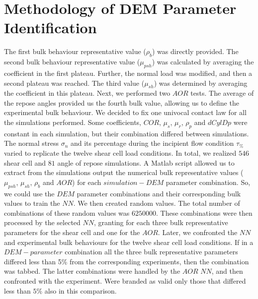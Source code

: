 \section{Methodology of DEM Parameter Identification}
\label{sec:methodology}

The first bulk behaviour representative value ($\rho_b$) was directly provided. 
The second bulk behaviour representative value ($\mu_{psh}$) was calculated by
averaging the coefficient in the first plateau.
Further, the normal load was modified, and then a second plateau was reached. The third value ($\mu_{sh}$) was 
determined by averaging the coefficient in this plateau. 
Next, we performed two $AOR$ tests. 
The average of the repose angles provided us the fourth bulk value, allowing us
to define the experimental bulk behaviour.
We decided to fix one univocal contact law for all the simulations performed. 
Some coefficients, $COR$, $\mu_s$, $\mu_r$,
$\rho_p$ and $dCylDp$
were constant in each simulation, but their combination differed between
simulations.
The normal stress $\sigma_n$ and its
percentage during the incipient flow condition $\tau_{\%}$
varied to replicate the twelve shear cell load conditions. 
In total, we realized $546$ shear cell and $81$ angle of repose simulations.
A Matlab script allowed us to extract from the simulations output the numerical
bulk representative values ($\mu_{psh}$, $\mu_{sh}$, $\rho_b$ and $AOR$) for each $simulation-DEM$ parameter combination. 
So, we could use the $DEM$ parameter combinations and their corresponding bulk values to train the $NN$. 
We then created random values.
The total number of combinations of these random values was $6250000$. These
combinations were then processed by the selected $NN$, granting for each three bulk representative parameters for the shear cell and one for the $AOR$. Later, we confronted the $NN$ and experimental bulk behaviours for the twelve shear cell load conditions. 
If in a $DEM-parameter$ combination all the three bulk representative parameters differed less 
than 5\% from the corresponding experiments,
then the combination was tabbed. The latter combinations were handled by the $AOR$ $NN$, and then confronted with the experiment. 
Were branded as valid only those that differed less than $5\%$ also in this
comparison.